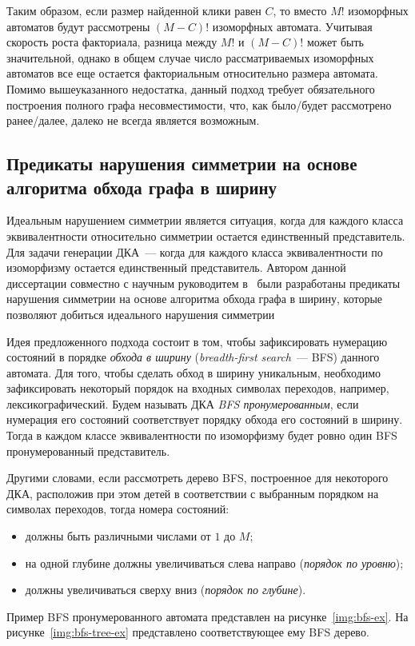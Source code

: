 Таким образом, если размер найденной клики равен $C$, то вместо $M!$ изоморфных автоматов будут рассмотрены $(M - C)!$ изоморфных автомата.
Учитывая скорость роста факториала, разница между $M!$ и $(M - C)!$ может быть значительной, однако в общем случае число рассматриваемых изоморфных автоматов все еще остается факториальным относительно размера автомата.
Помимо вышеуказанного недостатка, данный подход требует обязательного построения полного графа несовместимости, что, как было/будет  рассмотрено ранее/далее, далеко не всегда является возможным.

\subsection{Предикаты нарушения симметрии на основе алгоритма обхода графа в ширину}
\label{sec:review:sym-breaking:bfs-based}

Идеальным нарушением симметрии является ситуация, когда для каждого класса эквивалентности относительно симметрии остается единственный представитель. 
Для задачи генерации ДКА~{---} когда для каждого класса эквивалентности по изоморфизму остается единственный представитель.
Автором данной диссертации совместно с научным руководитем  в~\cite{zakirzyanov2015LATA} были разработаны предикаты нарушения симметрии на основе алгоритма обхода графа в ширину, которые позволяют добиться идеального нарушения симметрии

Идея предложенного подхода состоит в том, чтобы зафиксировать нумерацию состояний в порядке \emph{обхода в ширину} (\emph{breadth-first search}~{---} BFS) данного автомата.
Для того, чтобы сделать обход в ширину уникальным, необходимо зафиксировать некоторый порядок на входных символах переходов, например, лексикографический. 
Будем называть ДКА \emph{BFS пронумерованным}, если нумерация его состояний соответствует порядку обхода его состояний в ширину.
Тогда в каждом классе эквивалентности по изоморфизму будет ровно один BFS пронумерованный представитель.

Другими словами, если рассмотреть дерево BFS, построенное для некоторого ДКА, расположив при этом детей в соответствии с выбранным порядком на символах переходов, тогда номера состояний:
\begin{itemize}
  \item должны быть различными числами от $1$ до $M$;
  \item на одной глубине должны увеличиваться слева направо (\emph{порядок по уровню});
  \item должны увеличиваться сверху вниз (\emph{порядок по глубине}).
\end{itemize}
Пример BFS пронумерованного автомата представлен на рисунке~\ref{img:bfs-ex}.
На рисунке~\ref{img:bfs-tree-ex} представлено соответствующее ему BFS дерево.


